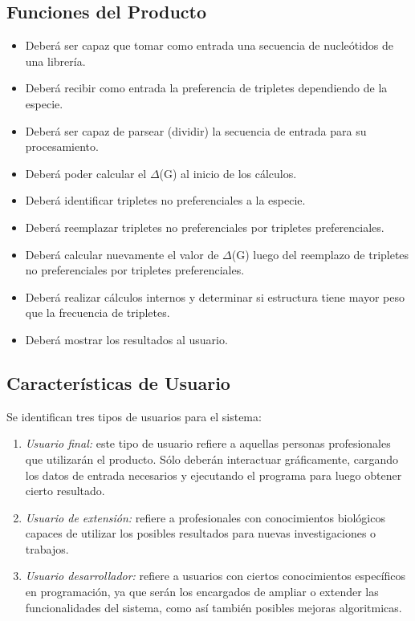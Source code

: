\documentclass[10pt,a4paper,english,spanish]{article}
\begin{document}
\subsection{Funciones del Producto}
	\begin{itemize}
		\item Deberá ser capaz que tomar como entrada una secuencia de nucleótidos de una librería.
		\item Deberá recibir como entrada la preferencia de tripletes dependiendo de la especie.	
		\item Deberá ser capaz de parsear (dividir) la secuencia de entrada para su procesamiento.
		\item Deberá poder calcular el $\Delta$(G) al inicio de los cálculos.
		\item Deberá identificar tripletes no preferenciales a la especie.
 		\item Deberá reemplazar tripletes no preferenciales por tripletes preferenciales.
		\item Deberá calcular nuevamente el valor de $\Delta$(G) luego del reemplazo de tripletes no 			  				preferenciales por tripletes preferenciales.
		\item Deberá realizar cálculos internos y determinar si estructura tiene mayor peso que la frecuencia de 				  tripletes.
		\item Deberá mostrar los resultados al usuario.
	\end{itemize}

\subsection{Características de Usuario}
	Se identifican tres tipos de usuarios para el sistema:
	\begin{enumerate}
 		\item \textit{Usuario final:} este tipo de usuario refiere a aquellas personas profesionales que utilizarán el 										producto. Sólo deberán interactuar gráficamente, cargando los datos de entrada 										necesarios y ejecutando el programa para luego obtener cierto resultado. 
		\item \textit{Usuario de extensión:} refiere a profesionales con conocimientos biológicos capaces de utilizar los 												posibles resultados para nuevas investigaciones o trabajos.
		\item \textit{Usuario desarrollador:} refiere a usuarios con ciertos conocimientos específicos en programación, 											ya que serán los encargados de ampliar o extender las funcionalidades del 												sistema, como así también posibles mejoras algoritmicas.
	\end{enumerate}
\end{document}
